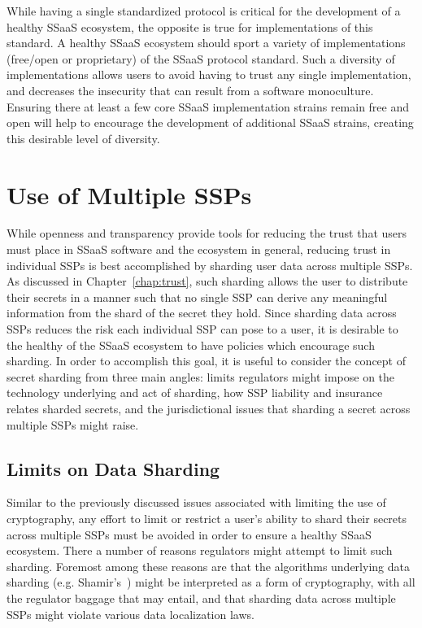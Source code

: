 While having a single standardized protocol is critical for the
development of a healthy SSaaS ecosystem, the opposite is true for
implementations of this standard. A healthy SSaaS ecosystem should
sport a variety of implementations (free/open or proprietary) of the
SSaaS protocol standard. Such a diversity of implementations allows
users to avoid having to trust any single implementation, and
decreases the insecurity that can result from a software
monoculture. Ensuring there at least a few core SSaaS implementation
strains remain free and open will help to encourage the development of
additional SSaaS strains, creating this desirable level of diversity.

\section{Use of Multiple SSPs}

While openness and transparency provide tools for reducing the trust
that users must place in SSaaS software and the ecosystem in general,
reducing trust in individual SSPs is best accomplished by sharding
user data across multiple SSPs. As discussed in
Chapter~\ref{chap:trust}, such sharding allows the user to distribute
their secrets in a manner such that no single SSP can derive any
meaningful information from the shard of the secret they hold. Since
sharding data across SSPs reduces the risk each individual SSP can
pose to a user, it is desirable to the healthy of the SSaaS ecosystem
to have policies which encourage such sharding. In order to accomplish
this goal, it is useful to consider the concept of secret sharding
from three main angles: limits regulators might impose on the
technology underlying and act of sharding, how SSP liability and
insurance relates sharded secrets, and the jurisdictional issues that
sharding a secret across multiple SSPs might raise.

\subsection{Limits on Data Sharding}

Similar to the previously discussed issues associated with limiting
the use of cryptography, any effort to limit or restrict a user's
ability to shard their secrets across multiple SSPs must be avoided in
order to ensure a healthy SSaaS ecosystem. There a number of reasons
regulators might attempt to limit such sharding. Foremost among these
reasons are that the algorithms underlying data sharding
(e.g. Shamir's~\cite{shamir1979}) might be interpreted as a form of
cryptography, with all the regulator baggage that may entail, and that
sharding data across multiple SSPs might violate various data
localization laws.


